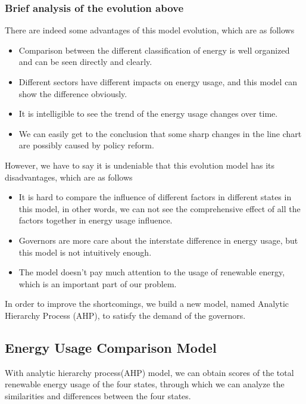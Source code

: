 \documentclass[a4paper,11pt]{article}
\begin{document}
\subsubsection{Brief analysis of the evolution above}
\par There are indeed some advantages of this model evolution, which are as follows
\begin{itemize}
    \item Comparison between the different classification of energy is well organized and can be seen directly and clearly.
    \item Different sectors have different impacts on energy usage, and this model can show the difference obviously.
    \item It is intelligible to see the trend of the energy usage changes over time.
    \item We can easily get to the conclusion that some sharp changes in the line chart are possibly caused by policy reform.  
\end{itemize}
\par However, we have to say it is undeniable that this evolution model has its disadvantages, which are as follows
\begin{itemize}
    \item It is hard to compare the influence of different factors in different states in this model, in other words, we can not see the comprehensive effect of all the factors together in energy usage influence.
    \item Governors are more care about the interstate difference in energy usage, but this model is not intuitively enough.
    \item The model doesn't pay much attention to the usage of renewable energy, which is an important part of our problem.
\end{itemize}
\par In order to improve the shortcomings, we build a new model, named Analytic Hierarchy Process (AHP), to satisfy the demand of the governors.


\subsection{Energy Usage Comparison Model}

\par With analytic hierarchy process(AHP) model, we can obtain scores of the total renewable energy usage of the four states, through which we can analyze the similarities and differences between the four states. 
\end{document}
